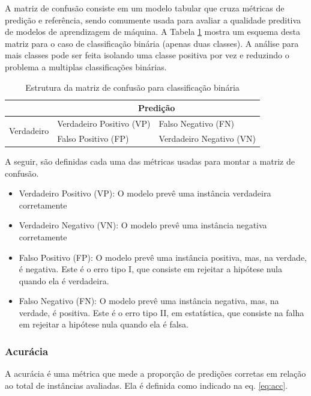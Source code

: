 A matriz de confusão consiste em um modelo tabular que cruza métricas de predição e referência, sendo comumente usada para avaliar a qualidade preditiva de modelos de aprendizagem de máquina. A Tabela \ref{tab:cm} mostra um esquema desta matriz para o caso de classificação binária (apenas duas classes). A análise para mais classes pode ser feita isolando uma classe positiva por vez e reduzindo o problema a multiplas classificações binárias.

\begin{table}[!ht]
  \centering
  \caption{Estrutura da matriz de confusão para classificação binária}
  \label{tab:cm}
  \begin{tabular}{lll}
    \toprule
    {}                          & \multicolumn{2}{c}{Predição}                            \\
    \midrule
    \multirow{2}{*}{Verdadeiro} & Verdadeiro Positivo (VP)     & Falso Negativo (FN)      \\
    {}                          & Falso Positivo (FP)          & Verdadeiro Negativo (VN) \\
    \bottomrule
  \end{tabular}
\end{table}

A seguir, são definidas cada uma das métricas usadas para montar a matriz de confusão.

\begin{itemize}
  \item Verdadeiro Positivo (VP): O modelo prevê uma instância verdadeira corretamente
  \item Verdadeiro Negativo (VN): O modelo prevê uma instância negativa corretamente
  \item Falso Positivo (FP): O modelo prevê uma instância positiva, mas, na verdade, é negativa. Este é o erro tipo I, que consiste em rejeitar a hipótese nula quando ela é verdadeira.
  \item Falso Negativo (FN): O modelo prevê uma instância negativa, mas, na verdade, é positiva. Este é o erro tipo II, em estatística, que consiste na falha em rejeitar a hipótese nula quando ela é falsa.
\end{itemize}



\subsubsection{Acurácia}
\label{sec:metricas-acc}

A acurácia é uma métrica que mede a proporção de predições corretas em relação ao total de instâncias avaliadas. Ela é definida como indicado na eq. \ref{eq:acc}.

